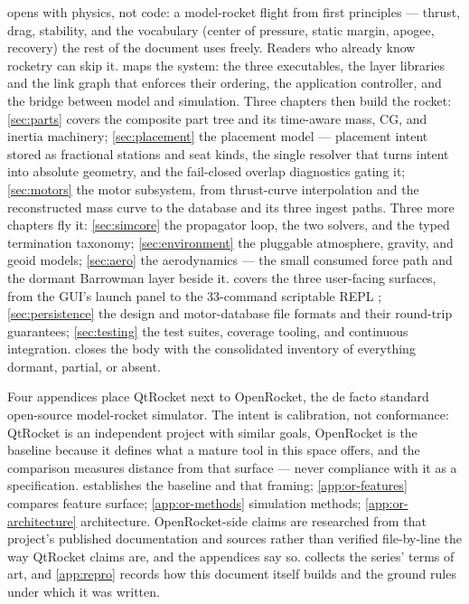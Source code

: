  opens with physics, not code: a model-rocket flight from first principles
--- thrust, drag, stability, and the vocabulary (center of pressure, static margin, apogee,
recovery) the rest of the document uses freely. Readers who already know rocketry can skip
it.  maps the system: the three executables, the layer libraries and the
link graph that enforces their ordering, the application controller, and the
 bridge between model and simulation. Three chapters then build the
rocket: \cref{sec:parts} covers the composite part tree and its time-aware mass, CG, and
inertia machinery; \cref{sec:placement} the placement model --- placement intent stored as
fractional stations and seat kinds, the single resolver that turns intent into absolute
geometry, and the fail-closed overlap diagnostics gating it; \cref{sec:motors} the motor
subsystem, from thrust-curve interpolation and the reconstructed mass curve to the database
and its three ingest paths. Three more chapters fly it: \cref{sec:simcore} the propagator
loop, the two solvers, and the typed termination taxonomy; \cref{sec:environment} the
pluggable atmosphere, gravity, and geoid models; \cref{sec:aero} the aerodynamics --- the
small consumed force path and the dormant Barrowman layer beside it. 
covers the three user-facing surfaces, from the GUI's launch panel to the 33-command
scriptable REPL ; \cref{sec:persistence} the design and
motor-database file formats and their round-trip guarantees; \cref{sec:testing} the test
suites, coverage tooling, and continuous integration.  closes the body
with the consolidated inventory of everything dormant, partial, or absent.

Four appendices place QtRocket next to OpenRocket, the de facto standard open-source
model-rocket simulator. The intent is calibration, not conformance: QtRocket is an
independent project with similar goals, OpenRocket is the baseline because it defines what a
mature tool in this space offers, and the comparison measures distance from that surface ---
never compliance with it as a specification.  establishes the baseline
and that framing; \cref{app:or-features} compares feature surface;
\cref{app:or-methods} simulation methods; \cref{app:or-architecture} architecture.
OpenRocket-side claims are researched from that project's published documentation and
sources rather than verified file-by-line the way QtRocket claims are, and the appendices
say so.  collects the series' terms of art, and \cref{app:repro} records
how this document itself builds and the ground rules under which it was written.
